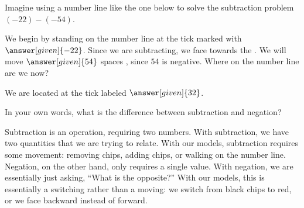\documentclass[nooutcomes]{ximera}
\begin{document}
\begin{example}
Imagine using a number line like the one below to solve the subtraction problem $(-22) - (-54)$.
\begin{center}
\end{center}
We begin by standing on the number line at the tick marked with $\answer[given]{-22}$.  Since 
we are subtracting, we face towards the .  We will 
move $\answer[given]{54}$ spaces , since 
$54$ is negative.  Where on the number line are we now? 

\begin{prompt}
We are located at the tick labeled $\answer[given]{32}$.
\end{prompt}
\end{example}


\begin{question}
In your own words, what is the difference between subtraction and negation?
\begin{freeResponse}
\begin{hint}
Subtraction is an operation, requiring two numbers.  With subtraction, we have two quantities that we are trying to relate.  With our models, subtraction requires some movement: removing chips, adding chips, or walking on the number line.  Negation, on the other hand, only requires a single value.  With negation, we are essentially just asking, ``What is the opposite?''  With our models, this is essentially a switching rather than a moving: we switch from black chips to red, or we face backward instead of forward.
\end{hint}
\end{freeResponse}
\end{question}
\end{document}
